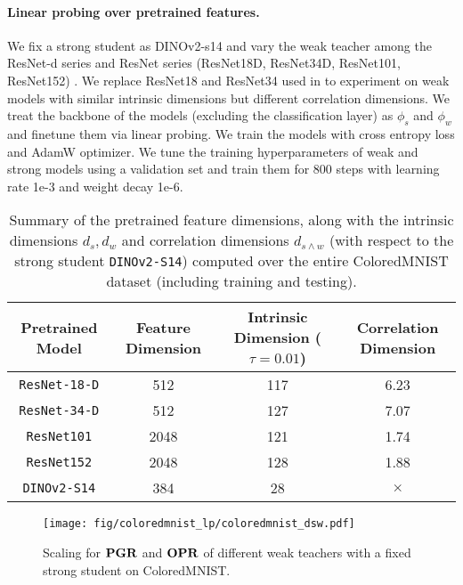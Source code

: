 \paragraph{Linear probing over pretrained features.} We fix a strong student as DINOv2-s14 \citep{oquab2023dinov2} and vary the weak teacher among the ResNet-d series and ResNet series (ResNet18D, ResNet34D, ResNet101, ResNet152) \citep{he2018resnetd,he2015deepresiduallearningimage}. We replace ResNet18 and ResNet34 used in  to experiment on weak models with similar intrinsic dimensions but different correlation dimensions. We treat the backbone of the models (excluding the classification layer) as $\phi_s$ and $\phi_w$ and finetune them via linear probing. We train the models with cross entropy loss and AdamW optimizer. We tune the training hyperparameters of weak and strong models using a validation set and train them for 800 steps with learning rate 1e-3 and weight decay 1e-6. 

\begin{table}[!ht]
    \centering
    \caption{Summary of the pretrained feature dimensions, along with the intrinsic dimensions $d_s, d_w$ and correlation dimensions $d_{s \wedge w}$ (with respect to the strong student \texttt{DINOv2-S14}) computed over the entire ColoredMNIST dataset (including training and testing).}\label{tab:img_cls_dim_coloredmnist}
    \begin{tabular}{c|ccc}
        \toprule
        Pretrained Model & Feature Dimension & Intrinsic Dimension ($\tau=0.01$) & Correlation Dimension \\
        \midrule
        \texttt{ResNet-18-D} & 512 & 117 & 6.23 \\
        \texttt{ResNet-34-D} & 512 & 127 & 7.07 \\
        \texttt{ResNet101} & 2048 & 121 & 1.74 \\
        \texttt{ResNet152} & 2048 & 128 & 1.88 \\
        \midrule
        \texttt{DINOv2-S14} & 384 & 28 & $\times$ \\
        \bottomrule
    \end{tabular}
\end{table}

\begin{figure}[!h]
    \centering
    \texttt{[image: fig/coloredmnist\_lp/coloredmnist\_dsw.pdf]}%
    \caption{Scaling for $\mathbf{PGR}$ and $\mathbf{OPR}$ of different weak teachers with a fixed strong student on ColoredMNIST.}\label{fig:coloredmnist_dscapw}
\end{figure}

